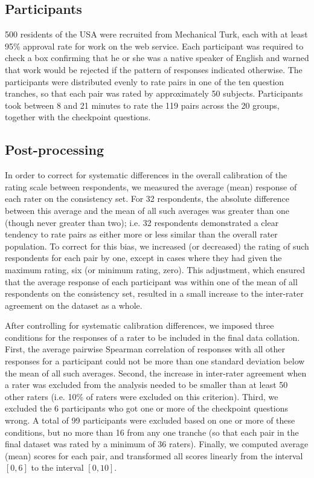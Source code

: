\subsection{Participants}

500 residents of the USA were recruited from Mechanical Turk, each with at least 95\% approval rate for work on the web service. Each participant was required to check a box confirming that he or she was a native speaker of English and warned that work would be rejected if the pattern of responses indicated otherwise. The participants were distributed evenly to rate pairs in one of the ten question tranches, so that each pair was rated by approximately 50 subjects. Participants took between 8 and 21 minutes to rate the 119 pairs across the 20 groups, together with the checkpoint questions. 

\subsection{Post-processing}

In order to correct for systematic differences in the overall calibration of the rating scale between respondents, we measured the average (mean) response of each rater on the consistency set. For 32 respondents, the absolute difference between this average and the mean of all such averages was greater than one (though never greater than two); i.e. 32 respondents demonstrated a clear tendency to rate pairs as either more or less similar than the overall rater population. To correct for this bias, we increased (or decreased) the rating of such respondents for each pair by one, except in cases where they had given the maximum rating, six (or minimum rating, zero). This adjustment, which ensured that the average response of each participant was within one of the mean of all respondents on the consistency set, resulted in a small increase to the inter-rater agreement on the dataset as a whole.     

After controlling for systematic calibration differences, we imposed three conditions for the responses of a rater to be included in the final data collation.  First, the average pairwise Spearman correlation of responses with all other responses for a participant could not be more than one standard deviation below the mean of all such averages. Second, the increase in inter-rater agreement when a rater was excluded from the analysis needed to be smaller than at least 50 other raters (i.e. 10\% of raters were excluded on this criterion). Third, we excluded the 6 participants who got one or more of the checkpoint questions wrong. A total of 99 participants were excluded based on one or more of these conditions, but no more than 16 from any one tranche (so that each pair in the final dataset was rated by a minimum of 36 raters). Finally, we computed average (mean) scores for each pair, and transformed all scores linearly from the interval \([0,6]\) to the interval \([0,10]\).

